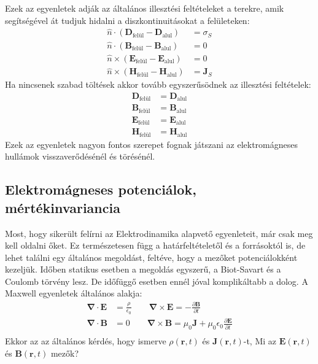 \documentclass[../main.tex]{subfiles}
\begin{document}
Ezek az egyenletek adják az általános illesztési feltételeket a terekre, amik segítségével át tudjuk hidalni a diszkontinuitásokat a felületeken:
\begin{equation}
    \begin{aligned}
        \hat{n} \cdot (\mathbf{D}_{\text{felül}} - \mathbf{D}_{\text{alul}}) &= \sigma_S \\
        \hat{n} \cdot (\mathbf{B}_{\text{felül}} - \mathbf{B}_{\text{alul}}) &= 0 \\
        \hat{n} \times (\mathbf{E}_{\text{felül}} - \mathbf{E}_{\text{alul}}) &= 0 \\
        \hat{n} \times (\mathbf{H}_{\text{felül}} - \mathbf{H}_{\text{alul}}) &= \mathbf{J}_S
    \end{aligned}
\end{equation}
Ha nincsenek szabad töltések akkor tovább egyszerűsödnek az illesztési feltételek:
\begin{equation}
    \begin{aligned}
        \mathbf{D}_{\text{felül}} &= \mathbf{D}_{\text{alul}} \\
        \mathbf{B}_{\text{felül}} &= \mathbf{B}_{\text{alul}} \\
        \mathbf{E}_{\text{felül}} &= \mathbf{E}_{\text{alul}} \\
        \mathbf{H}_{\text{felül}} &= \mathbf{H}_{\text{alul}}
    \end{aligned}
\end{equation}
Ezek az egyenletek nagyon fontos szerepet fognak játszani az elektromágneses hullámok visszaverődésénél és törésénél.

\subsection{Elektromágneses potenciálok, mértékinvariancia}
Most, hogy sikerült felírni az Elektrodinamika alapvető egyenleteit, már csak meg kell oldalni őket. Ez természetesen függ a határfeltételetől és a forrásoktól is, de lehet találni egy
általános megoldást, feltéve, hogy a mezőket potenciálokként kezeljük. Időben statikus esetben a megoldás egyszerű, a Biot-Savart és a Coulomb törvény lesz.
De időfüggő esetben ennél jóval komplikáltabb a dolog. A Maxwell egyenletek általános alakja:
\begin{equation}
    \begin{aligned}
        \boldsymbol{\nabla} \cdot \mathbf{E} &= \frac{\rho}{\epsilon_0} \qquad \boldsymbol{\nabla} \times \mathbf{E} = - \frac{\partial \mathbf{B}}{\partial t} \\
        \boldsymbol{\nabla} \cdot \mathbf{B} &= 0 \qquad \boldsymbol{\nabla} \times \mathbf{B} = \mu_0 \mathbf{J} + \mu_0 \epsilon_0 \frac{\partial \mathbf{E}}{\partial t} \\
    \end{aligned}
\end{equation}
Ekkor az az általános kérdés, hogy ismerve $\rho(\mathbf{r},t)$ és $\mathbf{J}(\mathbf{r},t)$-t, Mi az $\mathbf{E}(\mathbf{r},t)$ és $\mathbf{B}(\mathbf{r},t)$ mezők?
\end{document}
